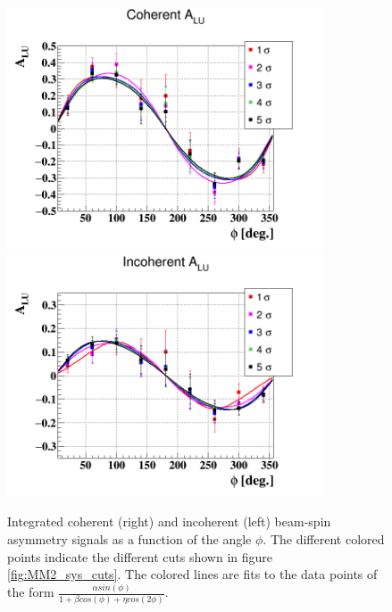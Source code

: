 \begin{figure}[h!]
   \includegraphics[height=7.2cm]{fig/BSA_Coherent_sigmas.png}
   \includegraphics[height=7.2cm]{fig/BSA_InCoherent_sigmas.png}
   \caption{ Integrated coherent (right) and incoherent (left) beam-spin 
asymmetry signals as a function of the angle $\phi$. The different colored 
points indicate the different cuts shown in figure \ref{fig:MM2_sys_cuts}. The 
colored lines are fits to the data points of the form $\frac{\alpha 
sin(\phi)}{1 + \beta cos(\phi) + \eta cos(2\phi)}$. }
\label{fig:alu_phi_sigmas}
\end{figure}


